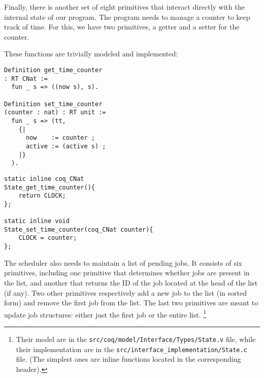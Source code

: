 	Finally, there is another set of eight primitives that interact directly with the internal state of our program. The program needs to manage a counter to keep track of time. For this, we have two primitives, a getter and a setter for the counter.

	These functions are trivially modeled and implemented:

	\begin{verbatim}
Definition get_time_counter
: RT CNat :=
  fun _ s => ((now s), s).

Definition set_time_counter
(counter : nat) : RT unit :=
  fun _ s => (tt,
    {|
      now    := counter ;
      active := (active s) ;
    |}
  ).
	\end{verbatim}

	\begin{verbatim}
static inline coq_CNat
State_get_time_counter(){
    return CLOCK;
};

static inline void
State_set_time_counter(coq_CNat counter){
    CLOCK = counter;
};
	\end{verbatim}
	The scheduler also needs to maintain a list of pending jobs. It consists of six primitives, including one primitive that determines whether jobs are present in the list, and another that returns the ID of the job located at the head of the list (if any). Two other primitives respectively add a new job to the list (in sorted form) and remove the first job from the list. The last two primitives are meant to update job structures: either just the first job or the entire list. \footnote{Their model are in the \texttt{src/coq/model/Interface/Types/State.v} file, while their implementation are in the \texttt{src/interface\_implementation/State.c} file. (The simplest ones are inline functions located in the corresponding header).}

